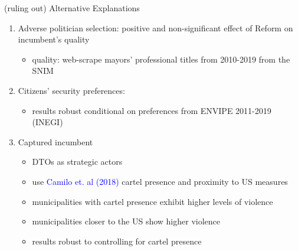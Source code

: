 \documentclass{beamer}
\begin{document}
\begin{frame}[label=alternative_explanations]{(ruling out) Alternative Explanations}

\begin{enumerate}
 		  \setlength\itemsep{1em}   

	\item Adverse politician selection: positive and non-significant effect of Reform on incumbent's quality \hyperlink{quality}{} 
	\begin{itemize}
		\item quality: web-scrape mayors' professional titles from 2010-2019 from the SNIM 
	\end{itemize}
	
	\item Citizens' security preferences:  %
		\begin{itemize}
		\item results robust conditional on preferences from ENVIPE 2011-2019 (INEGI)  \hyperlink{citizens_preferences_log}{} \hyperlink{citizens_preferences_ihs}{} 
		\end{itemize} 		
		
	\item Captured incumbent   \hyperlink{capture}{} 

		\begin{itemize}
		\item DTOs as strategic actors
		\item use \textcolor{blue}{Camilo et. al (2018)} cartel presence and proximity to US measures
		\item municipalities with cartel presence exhibit higher levels of violence
		\item municipalities closer to the US show higher violence
		\item results robust to controlling for cartel presence
		\end{itemize} 
\end{enumerate}
	
\end{frame}
\end{document}
